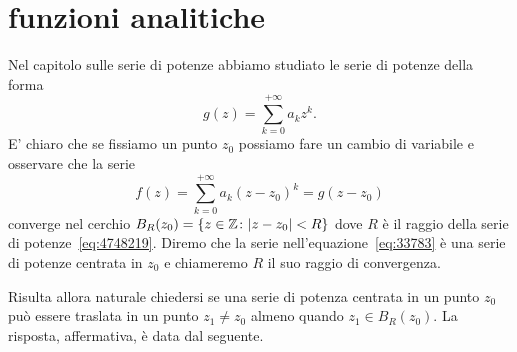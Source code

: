 
\section{funzioni analitiche}


Nel capitolo sulle serie di potenze abbiamo studiato le serie di potenze
della forma
\begin{equation}\label{eq:4748219}
    g(z) = \sum_{k=0}^{+\infty} a_k z^k.
\end{equation}
E' chiaro che se fissiamo un punto $z_0$ possiamo fare un cambio di variabile
e osservare che la serie
\begin{equation}\label{eq:33783}
  f(z) = \sum_{k=0}^{+\infty} a_k (z-z_0)^k = g(z-z_0)
\end{equation}
converge nel cerchio $B_R(z_0) = {\left\{ z \in \mathbb Z\colon {\left|z-z_0\right|}< R \right\}}$
dove $R$ è il raggio della serie di potenze~\eqref{eq:4748219}.
Diremo che la serie nell'equazione~\eqref{eq:33783} è una
serie di potenze centrata in $z_0$ e chiameremo $R$ il suo raggio di convergenza.

Risulta allora naturale chiedersi se una serie di potenza centrata in un punto $z_0$
può essere traslata in un punto $z_1\neq z_0$ almeno quando $z_1 \in B_R(z_0)$.
La risposta, affermativa, è data dal seguente.

